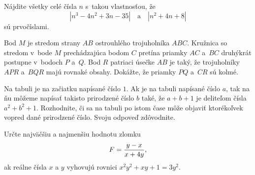 {%
Nájdite všetky celé čísla $n$ s~takou vlastnosťou, že
$$
|n^3-4n^2+3n-35|\quad\text{a}\quad |n^2+4n+8|
$$
sú prvočíslami.}

{%
Bod $M$ je stredom strany $AB$ ostrouhlého trojuholníka $ABC$. Kružnica so stredom v~bode $M$ prechádzajúca bodom $C$ pretína priamky $AC$ a~$BC$ druhýkrát postupne v~bodoch $P$ a~$Q$. Bod $R$ patriaci úsečke $AB$ je taký, že trojuholníky $APR$ a~$BQR$ majú rovnaké obsahy. Dokážte, že priamky $PQ$ a~$CR$ sú kolmé.}

{%
Na tabuli je na začiatku napísané číslo $1$. Ak je na tabuli napísané číslo $a$, tak na ňu môžeme napísať takisto prirodzené číslo $b$ také, že $a+b+1$ je deliteľom čísla $a^2+b^2+1$. Rozhodnite, či sa na tabuli po istom čase môže objaviť ktorékoľvek vopred dané prirodzené číslo. Svoju odpoveď zdôvodnite.
}

{%
Určte najväčšiu a najmenšiu hodnotu zlomku
   $$F={{y-x}\over{x+4y}},$$
ak reálne čísla $x$ a $y$ vyhovujú rovnici $x^2y^2+xy+1=3y^2$.
}

